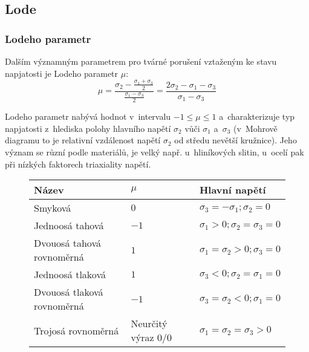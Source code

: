 
\subsection{Lode}
\subsubsection{Lodeho parametr}
Dalším významným parametrem pro tvárné porušení vztaženým ke stavu napjatosti je Lodeho parametr $\mu$:
\begin{equation}
	\mu
	= \frac{\sigma_2 - \frac{\sigma_1 + \sigma_3}{2}}{\frac{\sigma_1 - \sigma_3}{2}}
	= \frac{2 \sigma_2 - \sigma_1 - \sigma_3}{\sigma_1 - \sigma_3}
\end{equation}

Lodeho parametr nabývá hodnot v~intervalu $-1 \leq \mu \leq 1$
a~charakterizuje typ napjatosti z~hlediska polohy hlavního napětí $\sigma_2$ vůči $\sigma_1$ a~$\sigma_3$
(v~Mohrově diagramu to je relativní vzdálenost napětí $\sigma_2$ od středu nevětší kružnice).
Jeho význam se různí podle materiálů, je velký např. u~hliníkových slitin,
u~ocelí pak při nízkých faktorech triaxiality napětí.
\begin{figure}[H]\centering
\begin{tabular}{lll}
	\toprule
	Název                      & $\mu$                & Hlavní napětí                      \\
	\midrule
	Smyková                    & $0$                  & $\sigma_3= -\sigma_1; \sigma_2=0$  \\
	Jednoosá tahová            & $-1$                 & $\sigma_1>0; \sigma_2= \sigma_3=0$ \\
	Dvouosá tahová rovnoměrná  & $1$                  & $\sigma_1=\sigma_2>0; \sigma_3=0$  \\
	Jednoosá tlaková           & $1$                  & $\sigma_3<0; \sigma_2= \sigma_1=0$ \\
	Dvouosá tlaková rovnoměrná & $-1$                 & $\sigma_3=\sigma_2<0; \sigma_1=0$  \\
	Trojosá rovnoměrná         & Neurčitý výraz $0/0$ & $\sigma_1=\sigma_2=\sigma_3>0$     \\
	\bottomrule
\end{tabular}
\end{figure}

